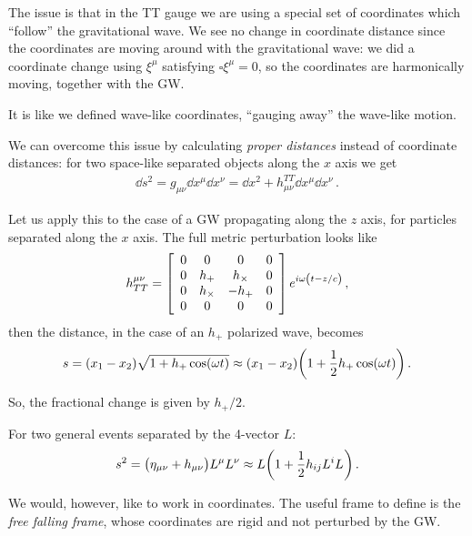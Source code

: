 \documentclass[main.tex]{subfiles}
\begin{document}
The issue is that in the TT gauge we are using a special set of coordinates which ``follow'' the gravitational wave. 
We see no change in coordinate distance since the coordinates are moving around with the gravitational wave: we did a coordinate change using \(\xi^{\mu }\) satisfying \(\square \xi^{\mu } = 0\), so the coordinates are harmonically moving, together with the GW. 

It is like we defined wave-like coordinates, ``gauging away'' the wave-like motion. 

We can overcome this issue by calculating \emph{proper distances} instead of coordinate distances: for two space-like separated objects along the \(x\) axis we get
%
\begin{align}
\dd{s^2} = g_{\mu \nu } \dd{x^{\mu }} \dd{x^{\nu }} = \dd{x^2} + h^{TT}_{\mu \nu } \dd{x^{\mu }} \dd{x^{\nu }} 
\,.
\end{align}

Let us apply this to the case of a GW propagating along the \(z\) axis, for particles separated along the \(x\) axis. The full metric perturbation looks like 
%
\begin{align}
h^{\mu \nu }_{TT} = \left[\begin{array}{cccc}
0 & 0 & 0 & 0 \\ 
0 & h_{+} & h_{ \times} & 0 \\ 
0 & h_{ \times } & - h_{+} & 0 \\ 
0 & 0 & 0 & 0
\end{array}\right] e^{i \omega \qty(t - z/c)}
\,,
\end{align}
%
then the distance, in the case of an \(h_{+}\) polarized wave, becomes 
%
\begin{align}
s = (x_1 - x_2 ) \sqrt{1 + h_{+} \cos(\omega t)}
\approx (x_1 -x_2 ) \qty(1 + \frac{1}{2} h_{+} \cos(\omega t))
\,.
\end{align}

So, the fractional change is given by \(h_{+} / 2\). 

For two general events separated by the 4-vector \(L\): 
%
\begin{align}
s^2 = \qty(\eta_{\mu \nu } + h_{\mu \nu } )L^{\mu } L^{\nu }
\approx L \qty(1 + \frac{1}{2} h_{ij} L^{i} L^{})
\,.
\end{align}

We would, however, like to work in coordinates. 
The useful frame to define is the \emph{free falling frame}, whose coordinates are rigid and not perturbed by the GW. 
\end{document}
